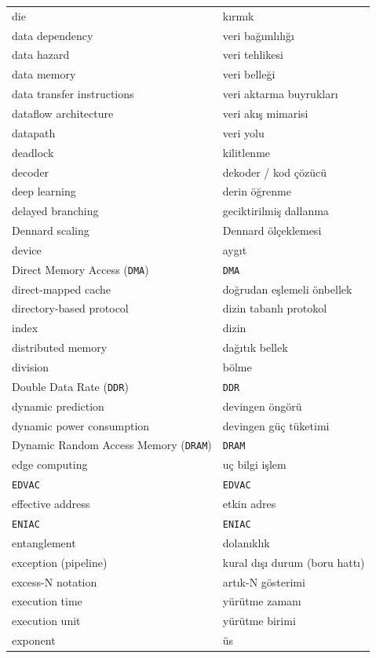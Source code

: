{\begin{longtable}{@{}p{7.6cm}p{7.6cm}@{}}
die & kırmık \\
data dependency & veri bağımlılığı \\
data hazard & veri tehlikesi \\
data memory & veri belleği \\
data transfer instructions & veri aktarma buyrukları \\
dataflow architecture & veri akış mimarisi \\
datapath & veri yolu \\
deadlock & kilitlenme \\
decoder & dekoder / kod çözücü \\
deep learning & derin öğrenme \\
delayed branching & geciktirilmiş dallanma \\
Dennard scaling & Dennard ölçeklemesi \\
device & aygıt \\
Direct Memory Access (\texttt{DMA}) & \texttt{DMA} \\
direct-mapped cache & doğrudan eşlemeli önbellek \\
directory-based protocol & dizin tabanlı protokol \\
index & dizin \\
distributed memory & dağıtık bellek \\
division & bölme \\
Double Data Rate (\texttt{DDR}) & \texttt{DDR} \\
dynamic prediction & devingen öngörü \\
dynamic power consumption & devingen güç tüketimi \\
Dynamic Random Access Memory (\texttt{DRAM}) & \texttt{DRAM} \\

edge computing & uç bilgi işlem \\
\texttt{EDVAC} & \texttt{EDVAC} \\
effective address & etkin adres \\
\texttt{ENIAC} & \texttt{ENIAC} \\
entanglement & dolanıklık \\
exception (pipeline) & kural dışı durum (boru hattı) \\
excess-N notation & artık-N gösterimi \\
execution time & yürütme zamanı \\
execution unit & yürütme birimi \\
exponent & üs \\


\end{longtable}}
